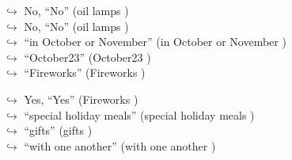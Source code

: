 \documentclass[11pt,a4paper, onecolumn]{article}
\begin{document}
\begin{figure}[t]
\begin{tcolorbox}[boxsep=0pt,left=5pt,right=0pt,top=2pt,colback = yellow!5]
\begin{dialogue}
\colorbox{pink!25}{$\hookrightarrow$}
\colorbox{red!25}{No,}
{ ``No'' (oil lamps ) }
\\
\colorbox{pink!25}{$\hookrightarrow$}
\colorbox{red!25}{No,}
{ ``No'' (oil lamps ) }
\\
\colorbox{pink!25}{$\hookrightarrow$}
{ ``in October or November'' (in October or November ) }
\\
\colorbox{pink!25}{$\hookrightarrow$}
{ ``October23'' (October23 ) }
\\
\colorbox{pink!25}{$\hookrightarrow$}
{ ``Fireworks'' (Fireworks ) }
 \end{dialogue}\end{tcolorbox}\end{figure}\begin{figure}[t] \small \begin{tcolorbox}[boxsep=0pt,left=5pt,right=0pt,top=2pt,colback = yellow!5] \begin{dialogue}
 \small 
\colorbox{pink!25}{$\hookrightarrow$}
\colorbox{red!25}{Yes,}
{ ``Yes'' (Fireworks ) }
\\
\colorbox{pink!25}{$\hookrightarrow$}
{ ``special holiday meals'' (special holiday meals ) }
\\
\colorbox{pink!25}{$\hookrightarrow$}
{ ``gifts'' (gifts ) }
\\
\colorbox{pink!25}{$\hookrightarrow$}
{ ``with one another'' (with one another ) }
\\
 \end{dialogue}\end{tcolorbox}\end{figure}
\end{document}
